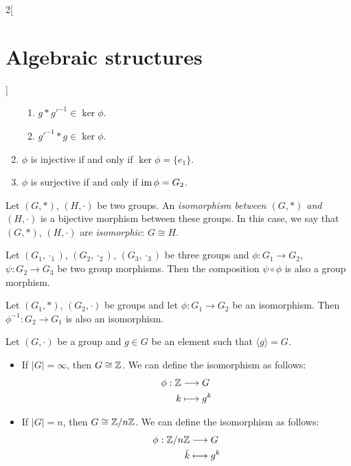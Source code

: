 \documentclass[../../../main.tex]{subfiles}
\begin{document}
\begin{multicols}{2}[\section{Algebraic structures}]
\begin{prop}
\begin{enumerate}
\begin{enumerate}
                      \item $g*g'^{-1}\in\ker\phi$.
                      \item $g'^{-1}*g\in\ker\phi$.
                  \end{enumerate}
            \item $\phi$ is injective if and only if $\ker\phi=\{e_1\}$.
            \item $\phi$ is surjective if and only if $\operatorname{im}\phi=G_2$.
        \end{enumerate}
    \end{prop}
    \begin{definition}
        Let $(G,*)$, $(H,\cdot)$ be two groups. An \textit{isomorphism between $(G,*)$ and $(H,\cdot)$} is a bijective morphism between these groups. In this case, we say that $(G,*)$, $(H,\cdot)$ are \textit{isomorphic}: $G\cong H$.
    \end{definition}
    \begin{prop}
        Let $(G_1,\cdot_1)$, $(G_2,\cdot_2)$, $(G_3,\cdot_3)$ be three groups and $\phi:G_1\rightarrow G_2$, $\psi:G_2\rightarrow G_3$ be two group morphisms. Then the composition $\psi\circ\phi$ is also a group morphism.
    \end{prop}
    \begin{prop}
        Let $(G_1,*)$, $(G_2,\cdot)$ be groups and let $\phi: G_1\rightarrow G_2$ be an isomorphism. Then $\phi^{-1}: G_2\rightarrow G_1$ is also an isomorphism.
    \end{prop}
    \begin{theorem}
        Let $(G,\cdot)$ be a group and $g\in G$ be an element such that $\langle g\rangle=G$.
        \begin{itemize}
            \item If $|G|=\infty$, then $G\cong\mathbb{Z} $. We can define the isomorphism as follows:
                  \begin{align*}
                      \phi:\mathbb{Z} & \longrightarrow G \\
                      k        & \longmapsto g^k
                  \end{align*}
            \item If $|G|=n$, then $G\cong\mathbb{Z} /n\mathbb{Z} $. We can define the isomorphism as follows:
                  \begin{align*}
                      \phi:\ZZ /n\ZZ & \longrightarrow G \\
                      \Bar{k}        & \longmapsto g^k

\end{align*}
\end{itemize}
\end{theorem}
\end{multicols}
\end{document}
